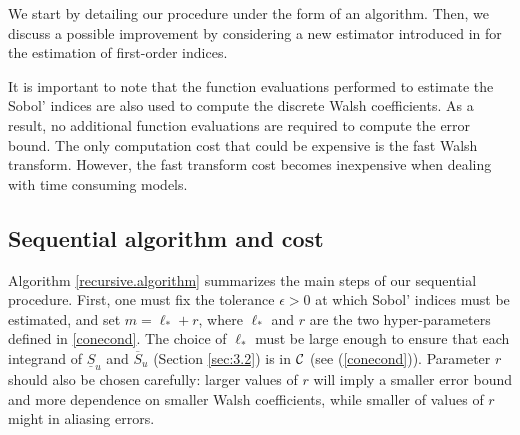 We start by detailing our procedure under the form of an algorithm. Then, we discuss a possible improvement by considering a new estimator introduced in \cite{Owen} for the estimation of first-order indices.

It is important to note that the function evaluations performed to estimate the Sobol' indices are also used to compute the discrete Walsh coefficients. As a result, no additional function evaluations are required to compute the error bound. The only computation cost that could be expensive is the fast Walsh transform. However, the fast transform cost becomes inexpensive when dealing with time consuming models.

\subsection{Sequential algorithm and cost}
\label{sec:4.1}

Algorithm \ref{recursive.algorithm} summarizes the main steps of our sequential procedure. First, one must fix the tolerance $\epsilon >0$ at which Sobol' indices must be estimated, and set $m=\ell_*+r$, where $\ell_*$ and $r$ are the two hyper-parameters defined in \eqref{conecond}. The choice of $\ell_*$ must be large enough to ensure that each integrand of $\underline{S}_u$ and $\overline{S}_u$ (Section \ref{sec:3.2}) is in $\mathcal{C}$ (see  (\ref{conecond})). Parameter $r$ should also be chosen carefully: larger values of $r$ will imply a smaller error bound and more dependence on smaller Walsh coefficients, while smaller of values of $r$ might  in aliasing errors.

